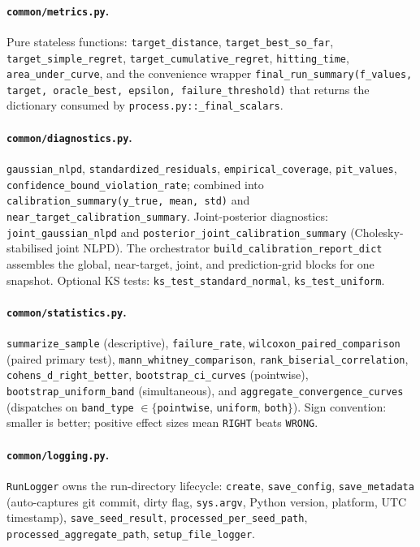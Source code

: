 \documentclass[11pt]{article}
\newcommand{\RIGHT}{\texttt{RIGHT}}
\newcommand{\WRONG}{\texttt{WRONG}}
\begin{document}
\paragraph{\texttt{common/metrics.py}.}
Pure stateless functions: \texttt{target\_distance}, \texttt{target\_best\_so\_far},
\texttt{target\_simple\_regret}, \texttt{target\_cumulative\_regret},
\texttt{hitting\_time}, \texttt{area\_under\_curve}, and the convenience wrapper
\texttt{final\_run\_summary(f\_values, target, oracle\_best, epsilon,
failure\_threshold)} that returns the dictionary consumed by
\texttt{process.py::\_final\_scalars}.
 
\paragraph{\texttt{common/diagnostics.py}.}
\texttt{gaussian\_nlpd}, \texttt{standardized\_residuals},
\texttt{empirical\_coverage}, \texttt{pit\_values},
\texttt{confidence\_bound\_violation\_rate};
combined into \texttt{calibration\_summary(y\_true, mean, std)} and
\texttt{near\_target\_calibration\_summary}.
Joint-posterior diagnostics: \texttt{joint\_gaussian\_nlpd} and
\texttt{posterior\_joint\_calibration\_summary} (Cholesky-stabilised joint NLPD).
The orchestrator \texttt{build\_calibration\_report\_dict} assembles the global,
near-target, joint, and prediction-grid blocks for one snapshot.
Optional KS tests: \texttt{ks\_test\_standard\_normal},
\texttt{ks\_test\_uniform}.

\paragraph{\texttt{common/statistics.py}.}
\texttt{summarize\_sample} (descriptive), \texttt{failure\_rate},
\texttt{wilcoxon\_paired\_comparison} (paired primary test),
\texttt{mann\_whitney\_comparison}, \texttt{rank\_biserial\_correlation},
\texttt{cohens\_d\_right\_better}, \texttt{bootstrap\_ci\_curves} (pointwise),
\texttt{bootstrap\_uniform\_band} (simultaneous), and
\texttt{aggregate\_convergence\_curves} (dispatches on
\texttt{band\_type} $\in\{$\texttt{pointwise}, \texttt{uniform}, \texttt{both}$\}$).
Sign convention: smaller is better; positive effect sizes mean \RIGHT{} beats \WRONG{}.
 
\paragraph{\texttt{common/logging.py}.}
\texttt{RunLogger} owns the run-directory lifecycle:
\texttt{create}, \texttt{save\_config},
\texttt{save\_metadata} (auto-captures git commit, dirty flag, \texttt{sys.argv},
Python version, platform, UTC timestamp),
\texttt{save\_seed\_result},
\texttt{processed\_per\_seed\_path},
\texttt{processed\_aggregate\_path},
\texttt{setup\_file\_logger}.
 
\end{document}
